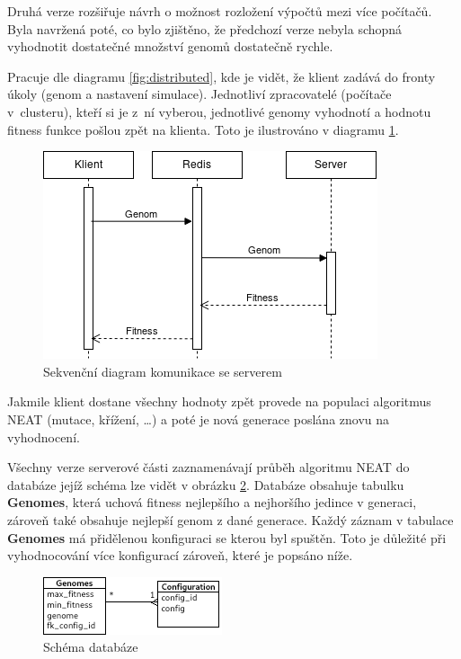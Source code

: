 Druhá verze rozšiřuje návrh o možnost rozložení výpočtů mezi více počítačů. Byla navržená poté, co bylo zjištěno, že předchozí verze nebyla schopná vyhodnotit dostatečné množství genomů dostatečně rychle.

Pracuje dle diagramu \ref{fig:distributed}, kde je vidět, že klient zadává do fronty úkoly (genom a nastavení simulace). Jednotliví zpracovatelé (počítače v~clusteru), kteří si je z~ní vyberou, jednotlivé genomy vyhodnotí a hodnotu fitness funkce pošlou zpět na klienta. Toto je ilustrováno v diagramu \ref{fig:serverusecase}.

\begin{figure}[H]
	\centering
	\includegraphics[width=0.7\linewidth]{server_use_case}
	\caption{Sekvenční diagram komunikace se serverem}
	\label{fig:serverusecase}
\end{figure}

Jakmile klient dostane všechny hodnoty zpět provede na populaci algoritmus NEAT (mutace, křížení, \dots) a poté je nová generace poslána znovu na vyhodnocení.

Všechny verze serverové části zaznamenávají průběh algoritmu NEAT do databáze jejíž schéma lze vidět v obrázku \ref{fig:database}. Databáze obsahuje tabulku \textbf{Genomes}, která uchová fitness nejlepšího a nejhoršího jedince v generaci, zároveň také obsahuje nejlepší genom z dané generace. Každý záznam v tabulace \textbf{Genomes} má přidělenou konfiguraci se kterou byl spuštěn. Toto je důležité při vyhodnocování více konfigurací zároveň, které je popsáno níže.

\begin{figure}[H]
	\centering
	\includegraphics[width=0.7\linewidth]{ERD}
	\caption{Schéma databáze}
	\label{fig:database}
\end{figure}

